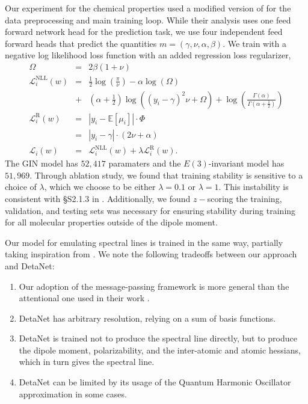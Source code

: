 \documentclass[10pt]{article} %
\theoremstyle{definition}
\begin{document}
Our experiment for the chemical properties used a modified version of \cite{TeachOpenCADD2023} for the data preprocessing and main training loop. While their analysis uses one feed forward network head for the prediction task, we use four independent feed forward heads that predict the quantities $m = (\gamma, \nu, \alpha, \beta)$. We train with a negative log likelihood loss function with an added regression loss regularizer,
%
\begin{eqnarray*}
\Omega &=& 2\beta (1 + \nu)\\
    \mathcal{L}_i^{\text{NLL}}(w) &=& \frac{1}{2}\log \left( \frac{\pi}{\nu}\right) - \alpha \log (\Omega) \\
    &+& \left(\alpha + \frac{1}{2}\right) 
    \log ( (y_i - \gamma)^2 \nu + \Omega)  + \log \left(\frac{\Gamma(\alpha)}{\Gamma(\alpha + \frac{1}{2})}\right)\\
    \mathcal{L}_i^{\text{R}}(w) &=& |y_i - \mathbb{E}[\mu_i]| \cdot \Phi \\
    &=& |y_i - \gamma| \cdot (2\nu + \alpha ) \\
    \mathcal{L}_i(w) &=& \mathcal{L}_i^{\text{NLL}}(w) + \lambda \mathcal{L}_i^{\text{R}}(w).
\end{eqnarray*}
%
The GIN model has $52,417$ paramaters and the $E(3)$-invariant model has $51,969$. Through ablation study, we found that training stability is sensitive to a choice of $\lambda$, which we choose to be either $\lambda = 0.1$ or $\lambda = 1$. This instability is consistent with \S S2.1.3 in \cite{amini2020deep}. Additionally, we found $z-$scoring the training, validation, and testing sets was necessary for ensuring stability during training for all molecular properties outside of the dipole moment.

Our model for emulating spectral lines is trained in the same way, partially taking inspiration from \cite{zou2023deep}. We note the following tradeoffs between our approach and DetaNet:

\begin{enumerate}
    \item Our adoption of the message-passing framework is more general than the attentional one used in their work \citep{bronstein2021geometric}.
    \item DetaNet has arbitrary resolution, relying on a sum of basis functions. 
    \item DetaNet is trained not to produce the spectral line directly, but to produce the dipole moment, polarizability, and the inter-atomic and atomic hessians, which in turn gives the spectral line. 
    \item DetaNet can be limited by its usage of the Quantum Harmonic Oscillator approximation in some cases.
\end{enumerate}   
\end{document}
